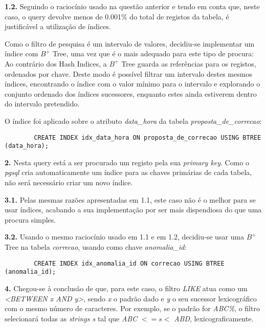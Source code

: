 \documentclass[12pt]{report}
\begin{document}
    \par \textbf{1.2.} Seguindo o raciocínio usado na questão anterior e tendo em conta que, neste caso, o query devolve menos de 0.001\% do total de registos da tabela, é justificável a utilização de índices.

    \par Como o filtro de pesquisa é um intervalo de valores, decidiu-se implementar um índice com $B^+$ Tree, uma vez que é o mais adequado para este tipo de procura: Ao contrário dos Hash Indices, a $B^+$ Tree guarda as referências para os registos, ordenados por chave. Deste modo é possível filtrar um intervalo destes mesmos índices, encontrando o índice com o valor mínimo para o intervalo e explorando o conjunto ordenado dos índices sucessores, enquanto estes ainda estiverem dentro do intervalo pretendido.
    \par O índice foi aplicado sobre o atributo \textit{{data\_hora}} da tabela \textit{proposta\_de\_correcao}:\\
    \footnotesize \begin{verbatim}
        CREATE INDEX idx_data_hora ON proposta_de_correcao USING BTREE (data_hora);
    \end{verbatim}\normalsize

    \par \textbf{2.} Nesta query está a ser procurado um registo pela sua \textit{primary key}. Como o \textit{pgsql} cria automaticamente um índice para as chaves primárias de cada tabela, não será necessário criar um novo índice.\\

    \par \textbf{3.1.} Pelas mesmas razões apresentadas em 1.1, este caso não é o melhor para se usar índices, acabando a sua implementação por ser mais dispendiosa do que uma procura simples.\\

    \par \textbf{3.2.} Usando o mesmo raciocínio usado em 1.1 e em 1.2, decidiu-se usar uma $B^+$ Tree na tabela \textit{correcao}, usando como chave \textit{anomalia\_id}:\\
    \footnotesize \begin{verbatim}
        CREATE INDEX idx_anomalia_id ON correcao USING BTREE (anomalia_id);
    \end{verbatim}\normalsize


    \par \textbf{4.} Chegou-se à conclusão de que, para este caso, o filtro \textit{LIKE} atua como um \textit{<BETWEEN x AND y>}, sendo \textit{x} o padrão dado e \textit{y} o seu sucessor lexicográfico com o mesmo número de caracteres. Por exemplo, se o padrão for \textit{ABC\%}, o filtro selecionará todas as \textit{strings s} tal que \textit{ABC} $<= s <$ \textit{ABD}, lexicograficamente.
\end{document}
